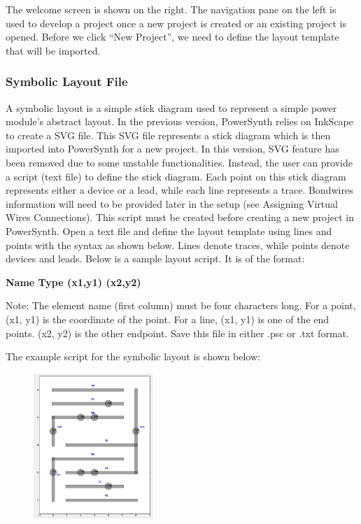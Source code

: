 \documentclass[11pt]{article}
\begin{document}
The welcome screen is shown on the right. The navigation pane on the left is used to develop a project once a new project is created or an existing project is opened. Before we click “New Project”, we need to define the layout template that will be imported.

\subsubsection{Symbolic Layout File}
\label{sec-2-2-2}

A symbolic layout is a simple stick diagram used to represent a simple power module’s abstract layout. In the previous version, PowerSynth relies on InkScape to create a SVG file. This SVG file represents a stick diagram which is then imported into PowerSynth for a new project. In this version, SVG feature has been removed due to some unstable functionalities. Instead, the user can provide a script (text file) to define the stick diagram.  Each point on this stick diagram represents either a device or a lead, while each line represents a trace. Bondwires information will need to be provided later in the setup (see Assigning Virtual Wires Connections). This script must be created before creating a new project in PowerSynth.  Open a text file and define the layout template using lines and points with the syntax as shown below. Lines denote traces, while points denote devices and leads. Below is a sample layout script. It is of the format: 

\textbf{Name Type (x1,y1) (x2,y2)}

Note: The element name (first column) must be four characters long.
For a point, (x1, y1) is the coordinate of the point.
For a line, (x1, y1) is one of the end points. (x2, y2) is the other endpoint. 
Save this file in either .psc or .txt format.

\pagebreak

The example script for the symbolic layout is shown below:
\begin{figure}
\centering
\includegraphics[width=0.4\textwidth]{./figs/03_SymLayout.png}
\end{figure}
\end{document}
